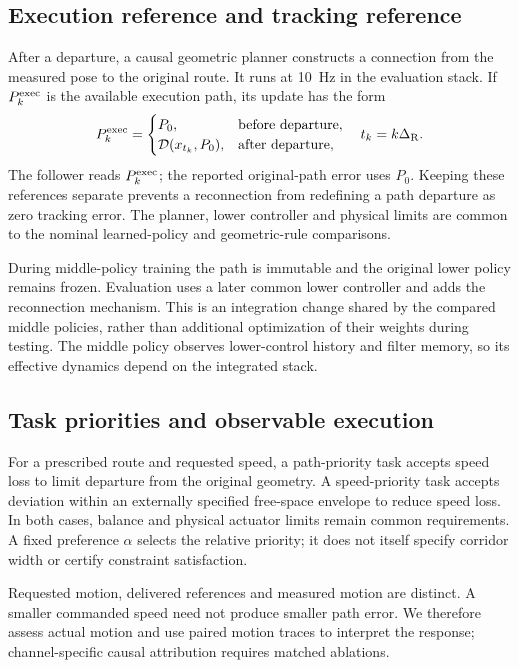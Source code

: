 \documentclass[final,5p,times,twocolumn]{elsarticle}
\begin{document}
\subsection{Execution reference and tracking reference}
After a departure, a causal geometric planner constructs a connection from the measured pose to the original route. It runs at 10~Hz in the evaluation stack. If $P_k^{\rm exec}$ is the available execution path, its update has the form
\begin{equation}
P_k^{\rm exec}=\begin{cases}
P_0,&\text{before departure},\\
\mathcal D(x_{t_k},P_0),&\text{after departure},
\end{cases}\quad t_k=k\Delta_{\rm R}.
\label{eq:reconnection}
\end{equation}
The follower reads $P_k^{\rm exec}$; the reported original-path error uses $P_0$. Keeping these references separate prevents a reconnection from redefining a path departure as zero tracking error. The planner, lower controller and physical limits are common to the nominal learned-policy and geometric-rule comparisons.

During middle-policy training the path is immutable and the original lower policy remains frozen. Evaluation uses a later common lower controller and adds the reconnection mechanism. This is an integration change shared by the compared middle policies, rather than additional optimization of their weights during testing. The middle policy observes lower-control history and filter memory, so its effective dynamics depend on the integrated stack.


\subsection{Task priorities and observable execution}
For a prescribed route and requested speed, a path-priority task accepts speed loss to limit departure from the original geometry. A speed-priority task accepts deviation within an externally specified free-space envelope to reduce speed loss. In both cases, balance and physical actuator limits remain common requirements. A fixed preference $\alpha$ selects the relative priority; it does not itself specify corridor width or certify constraint satisfaction.

Requested motion, delivered references and measured motion are distinct. A smaller commanded speed need not produce smaller path error. We therefore assess actual motion and use paired motion traces to interpret the response; channel-specific causal attribution requires matched ablations.
\end{document}
